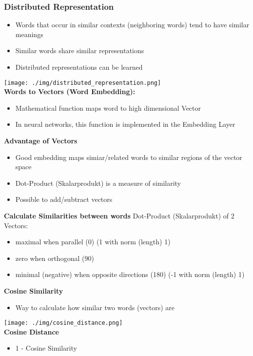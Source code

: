 \subsubsection{Distributed Representation}
\begin{itemize}
    \item Words that occur in similar contexts (neighboring words) tend to have similar meanings
    \item Similar words share similar representations
    \item Distributed representations can be learned
\end{itemize}
\texttt{[image: ./img/distributed\_representation.png]}\\
\textbf{Words to Vectors (Word Embedding):}
\begin{itemize}
    \item Mathematical function maps word to high dimensional Vector
    \item In neural networks, this function is implemented in the Embedding Layer
\end{itemize}
\textbf{Advantage of Vectors}
\begin{itemize}
    \item Good embedding maps simiar/related words to similar regions of the vector space
    \item Dot-Product (Skalarprodukt) is a measure of similarity
    \item Possible to add/subtract vectors
\end{itemize}
\textbf{Calculate Similarities between words}
Dot-Product (Skalarprodukt) of 2 Vectors:
\begin{itemize}
    \item maximal when parallel (0\textdegree) (1 with norm (length) 1)
    \item zero when orthogonal (90\textdegree)
    \item minimal (negative) when opposite directions (180\textdegree) (-1 with norm (length) 1)
\end{itemize}
\textbf{Cosine Similarity}
\begin{itemize}
    \item Way to calculate how similar two words (vectors) are
\end{itemize}
\texttt{[image: ./img/cosine\_distance.png]}\\ 
\textbf{Cosine Distance}
\begin{itemize}
    \item 1 - Cosine Similarity 
\end{itemize}